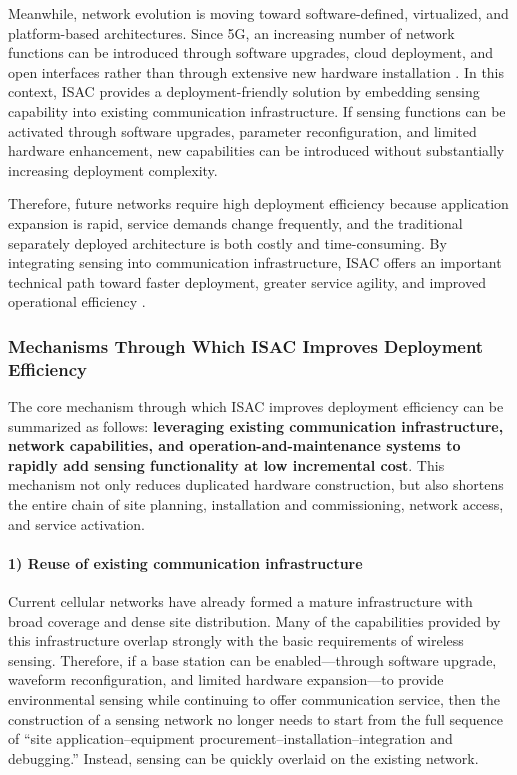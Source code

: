 Meanwhile, network evolution is moving toward software-defined, virtualized, and platform-based architectures. Since 5G, an increasing number of network functions can be introduced through software upgrades, cloud deployment, and open interfaces rather than through extensive new hardware installation \cite{Andrews2014, Letaief2019Roadmap}. In this context, ISAC provides a deployment-friendly solution by embedding sensing capability into existing communication infrastructure. If sensing functions can be activated through software upgrades, parameter reconfiguration, and limited hardware enhancement, new capabilities can be introduced without substantially increasing deployment complexity.

Therefore, future networks require high deployment efficiency because application expansion is rapid, service demands change frequently, and the traditional separately deployed architecture is both costly and time-consuming. By integrating sensing into communication infrastructure, ISAC offers an important technical path toward faster deployment, greater service agility, and improved operational efficiency \cite{Liu2022ISAC, IMT2030Framework,ITU2030}.

\subsubsection{Mechanisms Through Which ISAC Improves Deployment Efficiency}
\label{subsubsec:ch1-isac-core value-deployment-mechanism}

The core mechanism through which ISAC improves deployment efficiency can be summarized as follows: \textbf{leveraging existing communication infrastructure, network capabilities, and operation-and-maintenance systems to rapidly add sensing functionality at low incremental cost}. This mechanism not only reduces duplicated hardware construction, but also shortens the entire chain of site planning, installation and commissioning, network access, and service activation.

\paragraph{1) Reuse of existing communication infrastructure}
Current cellular networks have already formed a mature infrastructure with broad coverage and dense site distribution. Many of the capabilities provided by this infrastructure overlap strongly with the basic requirements of wireless sensing. Therefore, if a base station can be enabled---through software upgrade, waveform reconfiguration, and limited hardware expansion---to provide environmental sensing while continuing to offer communication service, then the construction of a sensing network no longer needs to start from the full sequence of ``site application--equipment procurement--installation--integration and debugging.'' Instead, sensing can be quickly overlaid on the existing network.


